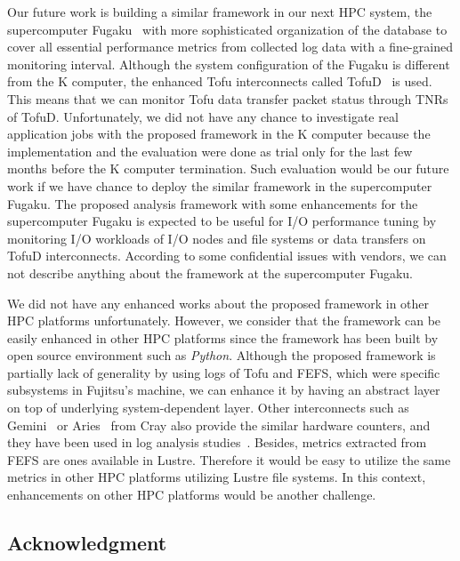 \documentclass{jhps}
\begin{document}
Our future work is building a similar framework in our next HPC system,
the supercomputer Fugaku~\cite{fugaku_info:web} with more sophisticated organization
of the database to cover all essential performance metrics
from collected log data with a fine-grained monitoring interval.
Although the system configuration of the Fugaku is different from the K computer,
the enhanced Tofu interconnects called TofuD~\cite{tofuD:cluster2018}
is used.
This means that we can monitor Tofu data transfer packet status
through TNRs of TofuD.
Unfortunately, we did not have any chance to investigate real application jobs
with the proposed framework in the K computer because the implementation
and the evaluation were done as trial only for the last few months
before the K computer termination.
Such evaluation would be our future work if we have chance to deploy
the similar framework in the supercomputer Fugaku.
The proposed analysis framework with some enhancements for the supercomputer Fugaku
is expected to be useful for I/O performance tuning by monitoring I/O workloads
of I/O nodes and file systems or data transfers on TofuD interconnects.
According to some confidential issues with vendors,
we can not describe anything about the framework at the supercomputer Fugaku.

We did not have any enhanced works about the proposed framework
in other HPC platforms unfortunately.
However, we consider that the framework can be easily enhanced
in other HPC platforms since the framework has been built
by open source environment such as {\itshape Python}.
Although the proposed framework is partially lack of generality
by using logs of Tofu and FEFS, which were specific subsystems in Fujitsu's machine,
we can enhance it by having an abstract layer
on top of underlying system-dependent layer.
Other interconnects such as Gemini~\cite{alverson:hoti10,pedretti:cug13} or
Aries~\cite{cray:aries_overview,cray:aries_hardware_counters}
from Cray also provide the similar hardware counters,
and they have been used in
log analysis studies~\cite{chunduri:pmbs19,ahlgren:cug18,zimmer:cug16,pedretti:cug13}.
Besides, metrics extracted from FEFS are ones available in Lustre.
Therefore it would be easy to utilize the same metrics in
other HPC platforms utilizing Lustre file systems.
In this context, enhancements on other HPC platforms would be
another challenge.

\subsection*{Acknowledgment}
\end{document}
